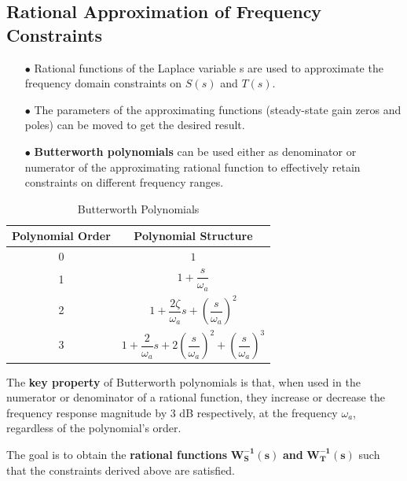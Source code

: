 \documentclass[a4paper,10pt,titlepage]{article}
\numberwithin{equation}{subsection}
\begin{document}
	\subsection{Rational Approximation of Frequency Constraints}
	\begin{enumerate}
		\item[$\bullet$] Rational functions of the Laplace variable s are used to approximate the frequency domain constraints on $S(s)$ and $T(s)$.
		\item[$\bullet$] The parameters of the approximating functions (steady-state gain zeros and poles) can be moved to get the desired result.
		\item[$\bullet$] \textbf{Butterworth polynomials} can be used either as denominator or numerator of the approximating rational function to effectively retain constraints on different frequency ranges.
	\end{enumerate}
	\begin{table}[H] %
		\begin{minipage}{0.52\textwidth} %
			\centering
			\begin{tabular}{|c|c|}
				\hline
				\textbf{Polynomial Order} & \textbf{Polynomial Structure} \\ \hline
				0 & $1$ \\ \hline
				1 & $1+\dfrac{s}{\omega_a}$ \\ \hline
				2 & $1+\dfrac{2\zeta}{\omega_a}s+\left(\dfrac{s}{\omega_a}\right)^2$ \\ \hline
				3 & $1+\dfrac{2}{\omega_a}s+2\left(\dfrac{s}{\omega_a}\right)^2+\left(\dfrac{s}{\omega_a}\right)^3$ \\ \hline
			\end{tabular}
			\caption{Butterworth Polynomials}
			\label{tab:polynomial_table}
		\end{minipage}
		\hfill
		\begin{minipage}{0.5\textwidth}
			\raggedright
			\vspace{-54pt}
			The \textbf{key property} of Butterworth polynomials is that, when used in the numerator or denominator of a rational function, they increase or decrease the frequency response magnitude by 3 dB respectively, at the frequency $\omega_a$, regardless of the polynomial's order.
		\end{minipage}
	\end{table}
	The goal is to obtain the \textbf{rational functions} $\bm{W_S^{-1}(s)}$ \textbf{and} $\bm{W_T^{-1}(s)}$ such that the constraints derived above are satisfied.
\end{document}
